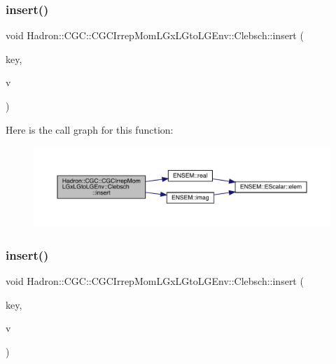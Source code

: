 \subsubsection{\texorpdfstring{insert()}{insert()}\hspace{0.1cm}{\footnotesize\ttfamily [1/2]}}
{\footnotesize\ttfamily void Hadron\+::\+C\+G\+C\+::\+C\+G\+C\+Irrep\+Mom\+L\+Gx\+L\+Gto\+L\+G\+Env\+::\+Clebsch\+::insert (\begin{DoxyParamCaption}\item[{const \mbox{\hyperlink{structHadron_1_1CGCKeyType}{C\+G\+C\+Key\+Type}}$<$ \mbox{\hyperlink{structHadron_1_1KeyCGCIrrepMom__t}{Key\+C\+G\+C\+Irrep\+Mom\+\_\+t}} $>$ \&}]{key,  }\item[{const \mbox{\hyperlink{namespaceHadron_1_1CGC_a52d2b70e6792726fb525eab94daae53b}{cdouble}} \&}]{v }\end{DoxyParamCaption})\hspace{0.3cm}{\ttfamily [inline]}}

Here is the call graph for this function\+:
\nopagebreak
\begin{figure}[H]
\begin{center}
\leavevmode
\includegraphics[width=350pt]{d1/d39/classHadron_1_1CGC_1_1CGCIrrepMomLGxLGtoLGEnv_1_1Clebsch_a4d4ec2ede98509ab49ac04fe23ef2ea8_cgraph}
\end{center}
\end{figure}
\mbox{\label{classHadron_1_1CGC_1_1CGCIrrepMomLGxLGtoLGEnv_1_1Clebsch_a4d4ec2ede98509ab49ac04fe23ef2ea8}} 
\subsubsection{\texorpdfstring{insert()}{insert()}\hspace{0.1cm}{\footnotesize\ttfamily [2/2]}}
{\footnotesize\ttfamily void Hadron\+::\+C\+G\+C\+::\+C\+G\+C\+Irrep\+Mom\+L\+Gx\+L\+Gto\+L\+G\+Env\+::\+Clebsch\+::insert (\begin{DoxyParamCaption}\item[{const \mbox{\hyperlink{structHadron_1_1CGCKeyType}{C\+G\+C\+Key\+Type}}$<$ \mbox{\hyperlink{structHadron_1_1KeyCGCIrrepMom__t}{Key\+C\+G\+C\+Irrep\+Mom\+\_\+t}} $>$ \&}]{key,  }\item[{const \mbox{\hyperlink{namespaceHadron_1_1CGC_a52d2b70e6792726fb525eab94daae53b}{cdouble}} \&}]{v }\end{DoxyParamCaption})\hspace{0.3cm}{\ttfamily [inline]}}

